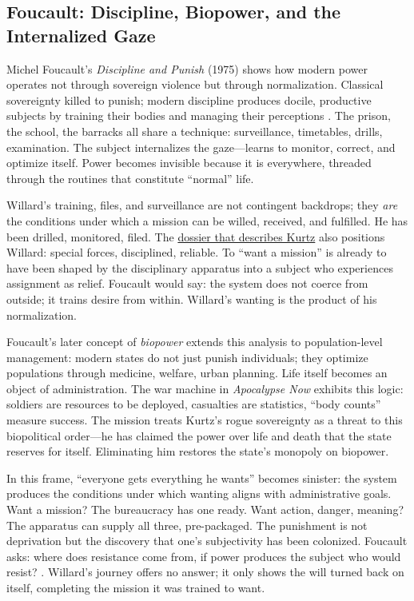 \subsection*{Foucault: Discipline, Biopower, and the Internalized Gaze}
\label{ssec:v-foucault}
Michel Foucault's \textit{Discipline and Punish} (1975) shows how modern power operates not
through sovereign violence but through normalization. Classical sovereignty killed to punish;
modern discipline produces docile, productive subjects by training their bodies and managing
their perceptions \parencite{FoucaultDiscipline1995}. The prison, the school, the barracks all
share a technique: surveillance, timetables, drills, examination. The subject internalizes the
gaze---learns to monitor, correct, and optimize itself. Power becomes invisible because it is
everywhere, threaded through the routines that constitute ``normal'' life.

Willard's training, files, and surveillance are not contingent backdrops; they \emph{are} the
conditions under which a mission can be willed, received, and fulfilled. He has been drilled,
monitored, filed. The \hyperref[scene:dossier-reading]{dossier that describes Kurtz} also
positions Willard: special forces, disciplined, reliable. To ``want a mission'' is already to
have been shaped by the disciplinary apparatus into a subject who experiences assignment as
relief. Foucault would say: the system does not coerce from outside; it trains desire from
within. Willard's wanting is the product of his normalization.

Foucault's later concept of \emph{biopower} extends this analysis to population-level
management: modern states do not just punish individuals; they optimize populations through
medicine, welfare, urban planning. Life itself becomes an object of
administration. The war machine in \textit{Apocalypse Now} exhibits this logic: soldiers are
resources to be deployed, casualties are statistics, ``body counts'' measure success. The
mission treats Kurtz's rogue sovereignty as a threat to this biopolitical order---he has
claimed the power over life and death that the state reserves for itself. Eliminating him
restores the state's monopoly on biopower.

In this frame, ``everyone gets everything he wants'' becomes sinister: the system produces the
conditions under which wanting aligns with administrative goals. Want a mission? The bureaucracy
has one ready. Want action, danger, meaning? The apparatus can supply all three, pre-packaged.
The punishment is not deprivation but the discovery that one's subjectivity has been colonized.
Foucault asks: where does resistance come from, if power produces the subject who would resist?
\parencite{FoucaultDiscipline1995}. Willard's journey offers no answer; it only shows the will
turned back on itself, completing the mission it was trained to want.

